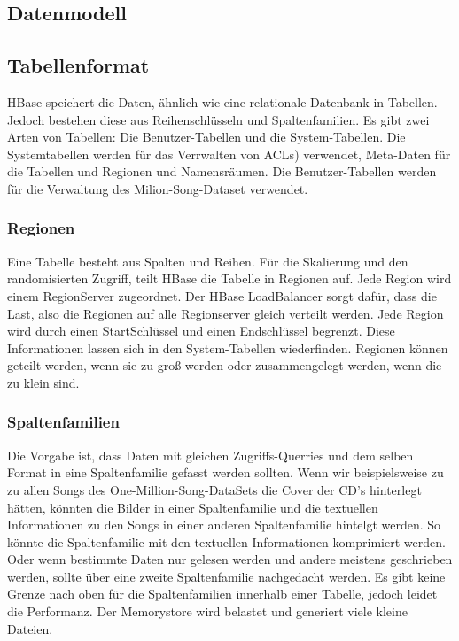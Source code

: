 \subsection{Datenmodell}


\subsection{Tabellenformat}
HBase speichert die Daten, ähnlich wie eine relationale Datenbank in Tabellen. Jedoch bestehen diese aus Reihenschlüsseln und Spaltenfamilien. Es gibt zwei Arten von Tabellen: Die Benutzer-Tabellen und die System-Tabellen.
Die Systemtabellen werden für das Verrwalten von ACLs) verwendet, Meta-Daten für die Tabellen und Regionen und Namensräumen. Die Benutzer-Tabellen werden für die Verwaltung des Milion-Song-Dataset verwendet.

\subsubsection{Regionen}
Eine Tabelle besteht aus Spalten und Reihen. Für die Skalierung  und den randomisierten Zugriff, teilt HBase die Tabelle in Regionen auf. Jede Region wird einem RegionServer zugeordnet. Der HBase LoadBalancer sorgt dafür, dass die Last, also die Regionen auf alle Regionserver gleich verteilt werden. Jede Region wird durch einen StartSchlüssel und einen Endschlüssel begrenzt. Diese Informationen lassen sich in den System-Tabellen wiederfinden. Regionen können geteilt werden, wenn sie zu groß werden oder zusammengelegt werden, wenn die zu klein sind.

\subsubsection{Spaltenfamilien}
Die Vorgabe ist, dass Daten mit gleichen Zugriffs-Querries und dem selben Format in eine Spaltenfamilie gefasst werden sollten. Wenn wir beispielsweise zu zu allen Songs des One-Million-Song-DataSets die Cover der CD's hinterlegt hätten, könnten die Bilder in einer Spaltenfamilie und die textuellen Informationen zu den Songs in einer anderen Spaltenfamilie hintelgt werden. So könnte die Spaltenfamilie mit den textuellen Informationen komprimiert werden. Oder wenn bestimmte Daten nur gelesen werden und andere meistens geschrieben werden, sollte über eine zweite Spaltenfamilie nachgedacht werden. Es gibt keine Grenze nach oben für die Spaltenfamilien innerhalb einer Tabelle, jedoch leidet die Performanz. Der Memorystore wird belastet und generiert viele kleine Dateien.


